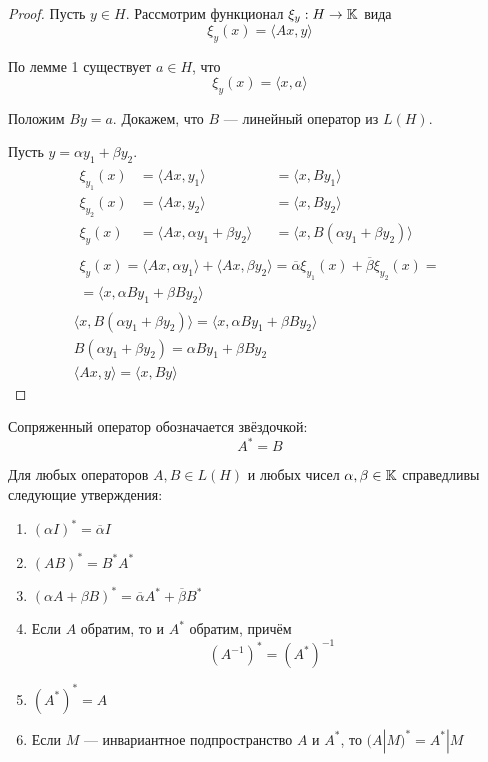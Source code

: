 \begin{proof}
    Пусть $y \in H$. Рассмотрим функционал $\xi_y : H \to \mathbb{K}$ вида
    \[ \xi_y(x) = \langle Ax, y\rangle \]

    По лемме 1 существует $a \in H$, что 
    \[ \xi_y(x) = \langle x, a\rangle \]

    Положим $By = a$. Докажем, что $B$ — линейный оператор из $L(H)$.

    Пусть $y = \alpha y_1 + \beta y_2$.
    \begin{gather*}
        \begin{alignedat}{2}
            \xi_{y_1}(x) &= \langle Ax, y_1\rangle &&= \langle x, By_1\rangle \\
            \xi_{y_2}(x) &= \langle Ax, y_2\rangle &&= \langle x, By_2\rangle \\
            \xi_{y}(x) &= \langle Ax, \alpha y_1 + \beta y_2 \rangle &&= \langle x,
            B(\alpha y_1 + \beta y_2) \rangle
        \end{alignedat} \\
        \begin{multlined}
            \xi_{y}(x) = \langle Ax, \alpha y_1 \rangle + \langle Ax, \beta y_2
            \rangle = \overline{\alpha}\xi_{y_1}(x) + \overline{\beta}\xi_{y_2}(x) =\\= \langle x, \alpha
            By_1 + \beta By_2\rangle
        \end{multlined} \\
        \langle x, B(\alpha y_1 + \beta y_2) \rangle = \langle x, \alpha By_1 +
        \beta By_2\rangle \\
        B(\alpha y_1 + \beta y_2) = \alpha By_1 + \beta By_2 \\
        \langle Ax, y\rangle = \langle x, By\rangle
    \end{gather*}
\end{proof}

Сопряженный оператор обозначается звёздочкой:
\[ A^* = B \]

\begin{lemma}\label{lemma:adjointproperties}
    Для любых операторов $A, B \in L(H)$ и любых чисел $\alpha, \beta \in
    \mathbb{K}$ справедливы следующие утверждения:
    \begin{enumerate}
        \item $ (\alpha I)^* = \overline{\alpha}I $
        \item $ (AB)^* = B^* A^* $
        \item $ (\alpha A + \beta B)^* = \overline{\alpha} A^* +
            \overline{\beta} B^* $
        \item Если $A$ обратим, то и $A^*$ обратим, причём
            \[ (A^{-1})^* = (A^*)^{-1} \]
        \item $ (A^*)^* = A $
        \item Если $M$ — инвариантное подпространство $A$ и $A^*$, то $(A|M)^* =
            A^* | M $
    \end{enumerate}
\end{lemma}

